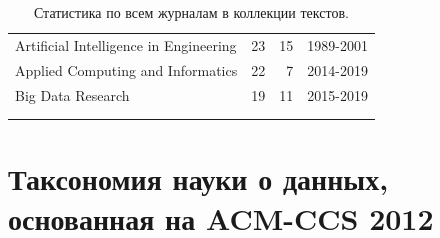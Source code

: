 \documentclass[12pt]{article}
\let\oldsection\section
\renewcommand{\section}{\clearpage\oldsection}
\begin{document}
\begin{center}
{\begin{longtable}{lrrl}
			Artificial Intelligence in Engineering                                               &        23 &       15 & 1989-2001 \\
			Applied Computing and Informatics                                                    &        22 &        7 & 2014-2019 \\
			Big Data Research                                                                    &        19 &       11 & 2015-2019 \\
			\bottomrule \\
			\caption{Статистика по всем журналам в коллекции текстов.}
		\end{longtable}
	}
	\end{center}

\section{Таксономия науки о данных, основанная на ACM-CCS 2012}
\label{appendix:ds_taxonomy}
\end{document}
